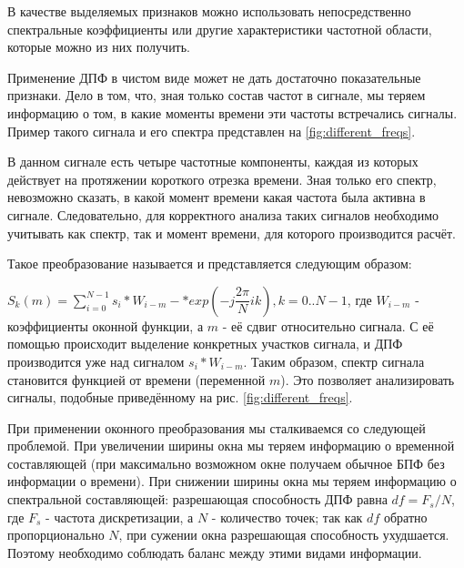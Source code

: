 В качестве выделяемых признаков можно использовать непосредственно спектральные коэффициенты или другие характеристики частотной области, которые можно из них получить.

Применение ДПФ в чистом виде может не дать достаточно показательные признаки. Дело в том, что, зная только состав частот в сигнале, мы теряем информацию о том, в какие моменты времени эти частоты встречались сигналы. Пример такого сигнала и его спектра представлен на \ref{fig:different_freqs}.


В данном сигнале есть четыре частотные компоненты, каждая из которых действует на протяжении короткого отрезка времени. Зная только его спектр, невозможно сказать, в какой момент времени какая частота была активна в сигнале. Следовательно, для корректного анализа таких сигналов необходимо учитывать как спектр, так и момент времени, для которого производится расчёт. 

Такое преобразование называется  и представляется следующим образом:

$S_k(m)=\sum_{i=0}^{N-1} s_i*W_{i-m}-*exp(-j\dfrac{2\pi}{N}ik), k=0..N-1$, где $W_{i-m}$ - коэффициенты оконной функции, а $m$ - её сдвиг относительно сигнала. С её помощью происходит выделение конкретных участков сигнала, и ДПФ производится уже над сигналом $s_i*W_{i-m}$. Таким образом, спектр сигнала становится функцией от времени (переменной $m$). Это позволяет анализировать сигналы, подобные приведённому на рис. \ref{fig:different_freqs}.


При применении оконного преобразования мы сталкиваемся со следующей проблемой. При увеличении ширины окна мы теряем информацию о временной составляющей (при максимально возможном окне получаем обычное БПФ без информации о времени). При снижении ширины окна мы теряем информацию о спектральной составляющей: разрешающая способность ДПФ равна $df=F_s/N$, где $F_s$ - частота дискретизации, а $N$ - количество точек; так как $df$ обратно пропорционально $N$, при сужении окна разрешающая способность ухудшается. Поэтому необходимо соблюдать баланс между этими видами информации. 


